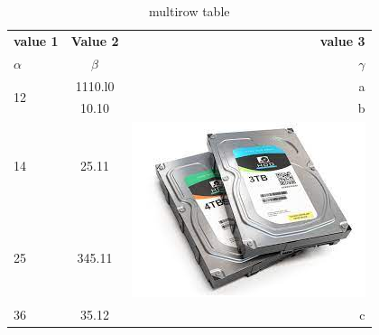 \documentclass{article}
\begin{document}
\begin{table}[h!]
  \begin{center}
  	\caption{multirow table}
  	\label{tab:table1}
  	\begin{tabular}{l|c|r}
  		\hline
  	  \textbf{value 1} & \textbf{Value 2} & \textbf{value 3}\\
  	  $\alpha$ & $\beta$ & $\gamma$ \\
  	  \hline
  	  \multirow{2}{*}{12} & 1110.l0 & a\\
  	  & 10.10 & b\\
  	  \hline
  	  14 & 25.11 & \multirow{2}{*}{\includegraphics[width=0.07\linewidth]{picture3}}\\
  	  25 & 345.11 & \\
  	  \hline
  	  36 & 35.12 & c \\
  	  \hline
  	  \end{tabular}
   \end{center}
\end{table}
\end{document}
